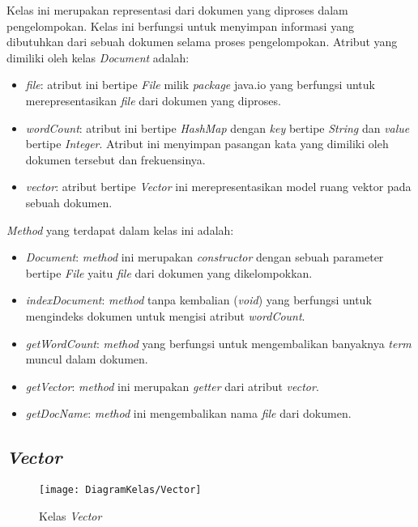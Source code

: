 Kelas ini merupakan representasi dari dokumen yang diproses dalam pengelompokan. Kelas ini berfungsi untuk menyimpan informasi yang dibutuhkan dari sebuah dokumen selama proses pengelompokan. Atribut yang dimiliki oleh kelas \textit{Document} adalah:

\begin{itemize}
	\item \textit{file}: atribut ini bertipe \textit{File} milik \textit{package} java.io yang berfungsi untuk merepresentasikan \textit{file} dari dokumen yang diproses.
	\item \textit{wordCount}: atribut ini bertipe \textit{HashMap} dengan \textit{key} bertipe \textit{String} dan \textit{value} bertipe \textit{Integer}. Atribut ini menyimpan pasangan kata yang dimiliki oleh dokumen tersebut dan frekuensinya.
	\item \textit{vector}: atribut bertipe \textit{Vector} ini merepresentasikan model ruang vektor pada sebuah dokumen.
\end{itemize}

\textit{Method} yang terdapat dalam kelas ini adalah:

\begin{itemize}
	\item \textit{Document}: \textit{method} ini merupakan \textit{constructor} dengan sebuah parameter bertipe \textit{File} yaitu \textit{file} dari dokumen yang dikelompokkan.
	\item \textit{indexDocument}: \textit{method} tanpa kembalian (\textit{void}) yang berfungsi untuk mengindeks dokumen untuk mengisi atribut \textit{wordCount}.
	\item \textit{getWordCount}: \textit{method} yang berfungsi untuk mengembalikan banyaknya \textit{term} muncul dalam dokumen.
	\item \textit{getVector}: \textit{method} ini merupakan \textit{getter} dari atribut \textit{vector}.
	\item \textit{getDocName}: \textit{method} ini mengembalikan nama \textit{file} dari dokumen.
\end{itemize}

\subsection{\textit{Vector}}

\begin{figure}[H]
	\begin{center}
		\texttt{[image: DiagramKelas/Vector]}
		\caption{Kelas \textit{Vector}}
		\label{fig:kelasVector}
	\end{center}
\end{figure}

